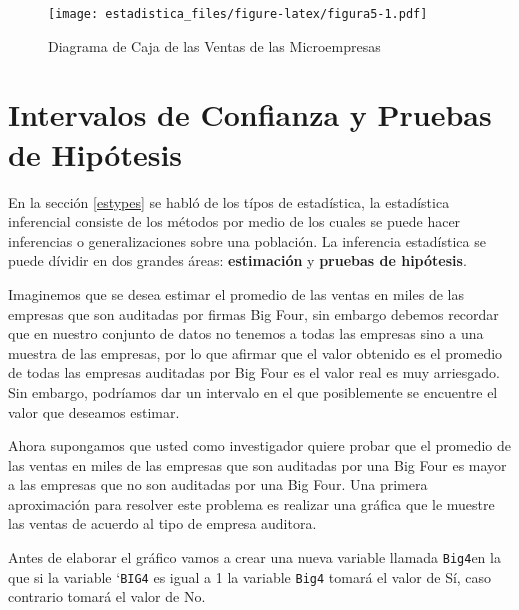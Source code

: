 \documentclass[]{book}
\newenvironment{Shaded}{\begin{snugshade}}{\end{snugshade}}
\newcommand{\KeywordTok}[1]{\textcolor[rgb]{0.13,0.29,0.53}{\textbf{#1}}}
\newcommand{\DataTypeTok}[1]{\textcolor[rgb]{0.13,0.29,0.53}{#1}}
\newcommand{\DecValTok}[1]{\textcolor[rgb]{0.00,0.00,0.81}{#1}}
\newcommand{\StringTok}[1]{\textcolor[rgb]{0.31,0.60,0.02}{#1}}
\newcommand{\OperatorTok}[1]{\textcolor[rgb]{0.81,0.36,0.00}{\textbf{#1}}}
\newcommand{\NormalTok}[1]{#1}
\begin{document}
\begin{figure}
\centering
\texttt{[image: estadistica\_files/figure-latex/figura5-1.pdf]}
\caption{\label{fig:figura5}Diagrama de Caja de las Ventas de las
Microempresas}
\end{figure}

\chapter{Intervalos de Confianza y Pruebas de
Hipótesis}\label{intervalos-de-confianza-y-pruebas-de-hipotesis}

En la sección \ref{estypes} se habló de los típos de estadística, la
estadística inferencial consiste de los métodos por medio de los cuales
se puede hacer inferencias o generalizaciones sobre una población. La
inferencia estadística se puede dívidir en dos grandes áreas:
\textbf{estimación} y \textbf{pruebas de hipótesis}.

Imaginemos que se desea estimar el promedio de las ventas en miles de
las empresas que son auditadas por firmas Big Four, sin embargo debemos
recordar que en nuestro conjunto de datos no tenemos a todas las
empresas sino a una muestra de las empresas, por lo que afirmar que el
valor obtenido es el promedio de todas las empresas auditadas por Big
Four es el valor real es muy arriesgado. Sin embargo, podríamos dar un
intervalo en el que posiblemente se encuentre el valor que deseamos
estimar.

Ahora supongamos que usted como investigador quiere probar que el
promedio de las ventas en miles de las empresas que son auditadas por
una Big Four es mayor a las empresas que no son auditadas por una Big
Four. Una primera aproximación para resolver este problema es realizar
una gráfica que le muestre las ventas de acuerdo al tipo de empresa
auditora.

Antes de elaborar el gráfico vamos a crear una nueva variable llamada
\texttt{Big4}en la que si la variable `\texttt{BIG4} es igual a 1 la
variable \texttt{Big4} tomará el valor de Sí, caso contrario tomará el
valor de No.

\begin{Shaded}
\end{Shaded}
\end{document}
